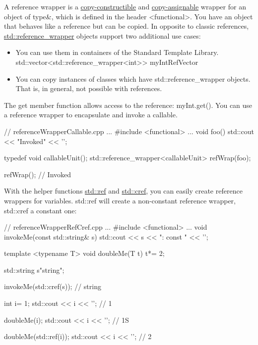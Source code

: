 A reference wrapper is a \href{http://en.cppreference.com/w/cpp/concept/CopyConstructible}{copy-constructible} and \href{http://en.cppreference.com/w/cpp/concept/CopyAssignable}{copy-assignable} wrapper for an object of type\&, which is defined in the header <functional>. You have an object that behaves like a reference but can be copied. In opposite to classic references, \href{http://en.cppreference.com/w/cpp/utility/functional/reference_wrapper}{std::reference\_wrapper} objects support two additional use cases:

\begin{itemize}
\item 
You can use them in containers of the Standard Template Library. std::vector<std::reference\_wrapper<int>{}> myIntRefVector

\item 
You can copy instances of classes which have std::reference\_wrapper objects. That is, in general, not possible with references.
\end{itemize}

The get member function allows access to the reference: myInt.get(). You can use a reference wrapper to encapsulate and invoke a callable.


\begin{cpp}
// referenceWrapperCallable.cpp
...
#include <functional>
...
void foo(){
	std::cout << "Invoked" << '\n';
}

typedef void callableUnit();
std::reference_wrapper<callableUnit> refWrap(foo);

refWrap(); // Invoked
\end{cpp}


With the helper functions \href{http://en.cppreference.com/w/cpp/utility/functional/ref}{std::ref} and \href{http://en.cppreference.com/w/cpp/utility/functional/ref}{std::cref}, you can easily create reference wrappers for variables. std::ref will create a non-constant reference wrapper, std::cref a constant one:


\begin{cpp}
// referenceWrapperRefCref.cpp
...
#include <functional>
...
void invokeMe(const std::string& s){
	std::cout << s << ": const " << '\n';
}

template <typename T>
void doubleMe(T t){
	t*= 2;
}

std::string s{"string"};

invokeMe(std::cref(s)); // string

int i= 1;
std::cout << i << '\n'; // 1

doubleMe(i);
std::cout << i << '\n'; // 1S

doubleMe(std::ref(i));
std::cout << i << '\n'; // 2
\end{cpp}

